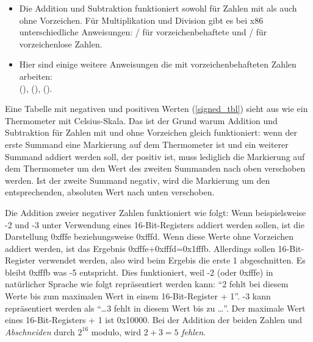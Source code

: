 \begin{itemize}
\item 
	Die Addition und Subtraktion funktioniert sowohl für Zahlen mit als auch ohne Vorzeichen.
	Für Multiplikation und Division gibt es bei x86 unterschiedliche Anweisungen:
	/ für vorzeichenbehaftete und / für vorzeichenlose Zahlen.
\item
	Hier sind einige weitere Anweisungen die mit vorzeichenbehafteten Zahlen arbeiten:\\
	 (),  (),  ().
\end{itemize}

Eine Tabelle mit negativen und positiven Werten (\ref{signed_tbl}) sieht aus wie ein Thermometer mit Celsius-Skala.
Das ist der Grund warum Addition und Subtraktion für Zahlen mit und ohne Vorzeichen gleich funktioniert:
wenn der erste Summand eine Markierung auf dem Thermometer ist und ein weiterer Summand addiert werden soll,
der positiv ist, muss lediglich die Markierung auf dem Thermometer um den Wert des zweiten Summanden nach
oben verschoben werden.
Ist der zweite Summand negativ, wird die Markierung um den entsprechenden, absoluten Wert nach unten verschoben.

Die Addition zweier negativer Zahlen funktioniert wie folgt:
Wenn beispielsweise -2 und -3 unter Verwendung eines 16-Bit-Registers addiert werden sollen,
ist die Darstellung 0xfffe beziehungsweise 0xfffd.
Wenn diese Werte ohne Vorzeichen addiert werden, ist das Ergebnis 0xfffe+0xfffd=0x1fffb.
Allerdings sollen 16-Bit-Register verwendet werden, also wird beim Ergebis die erste 1 abgeschnitten.
Es bleibt 0xfffb was -5 entspricht.
Dies funktioniert, weil -2 (oder 0xfffe) in natürlicher Sprache wie folgt repräsentiert werden kann:
``2 fehlt bei diesem Werte bis zum maximalen Wert in einem 16-Bit-Register + 1''.
-3 kann repräsentiert werden als ``\dots 3 fehlt in diesem Wert bis zu \dots''.
Der maximale Wert eines 16-Bit-Registers + 1 ist 0x10000.
Bei der Addition der beiden Zahlen und \emph{Abschneiden}  durch $2^{16}$ modulo,
wird $2+3=5$ \emph{fehlen}.







